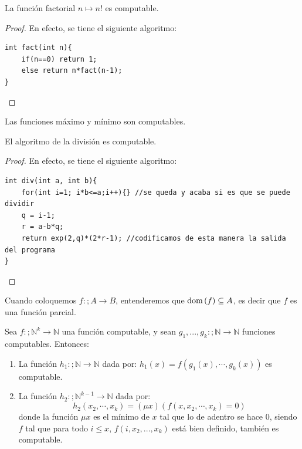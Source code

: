 \documentclass[12pt]{report}
\newcounter{it}
\theoremstyle{largebreak}
\newcommand\cf[3]{\ensuremath{#1:#2\rightarrow#3}}
\newcommand{\dom}[1]{\textup{dom}\left(#1 \right)}
\begin{document}
    \begin{exa}
        La función factorial $n\mapsto n!$ es computable.
    \end{exa}

    \begin{proof}
        En efecto, se tiene el siguiente algoritmo:
        \begin{lstlisting}
int fact(int n){
    if(n==0) return 1;
    else return n*fact(n-1);
}
        \end{lstlisting}
    \end{proof}

    \begin{exa}
        Las funciones máximo y mínimo son computables.
    \end{exa}

    \begin{exa}
        El algoritmo de la división es computable.
    \end{exa}

    \begin{proof}
        En efecto, se tiene el siguiente algoritmo:
        \begin{lstlisting}
int div(int a, int b){
    for(int i=1; i*b<=a;i++){} //se queda y acaba si es que se puede dividir
    q = i-1;
    r = a-b*q;
    return exp(2,q)*(2*r-1); //codificamos de esta manera la salida del programa
}
        \end{lstlisting}
    \end{proof}

    \begin{obs}
        Cuando coloquemos $\cf{f}{;A}{B}$, entenderemos que $\dom{f}\subseteq A$, es decir que $f$ es una función parcial.
    \end{obs}

    \begin{theor}
        Sea $\cf{f}{;\mathbb{N}^k}{\mathbb{N}}$ una función computable, y sean $\cf{g_1,...,g_k}{;\mathbb{N}}{\mathbb{N}}$ funciones computables. Entonces:
        \begin{enumerate}[label = \textit{(\arabic*)}]
            \item La función $\cf{h_1}{;\mathbb{N}}{\mathbb{N}}$ dada por: $h_1(x)=f(g_1(x),\cdots,g_k(x))$ es computable.
            \item La función $\cf{h_2}{;\mathbb{N}^{ k-1}}{\mathbb{N}}$ dada por:
            \begin{equation*}
                h_2(x_2,\cdots,x_k)=(\mu x)(f(x,x_2,\cdots,x_k)=0)
            \end{equation*}
            donde la función $\mu x$ es el mínimo de $x$ tal que lo de adentro se hace 0, siendo $f$ tal que para todo $i\leq x$, $f(i,x_2,...,x_k)$ está bien definido, también es computable.
        \end{enumerate}
    \end{theor}
\end{document}
